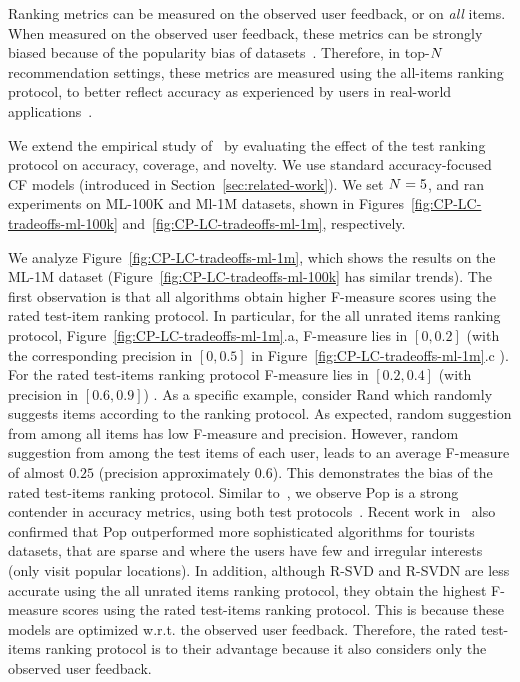 Ranking metrics can be  measured on the observed  user feedback, or on \emph{all} items.  When  measured on the observed  user feedback, these metrics can  be strongly biased because of the  popularity bias of datasets~\cite{agarwal_chen_2016,cremonesi2010performance,steck2011item,vargas2014improving,steck2013evaluation}.  Therefore,  in top-$N$ recommendation settings, these metrics are measured  using  the all-items ranking protocol,  to better reflect  accuracy as experienced by users  in real-world applications~\cite{steck2013evaluation,vargas2014improving}.


We extend the empirical study of~\cite{steck2013evaluation} by evaluating  the effect of the test ranking protocol on  accuracy, coverage, and novelty.  We use standard  accuracy-focused CF models (introduced in Section~\ref{sec:related-work}).  We set $N=5$, and ran experiments on  ML-100K and Ml-1M  datasets, shown in  Figures~\ref{fig:CP-LC-tradeoffs-ml-100k}  and~\ref{fig:CP-LC-tradeoffs-ml-1m}, respectively.    %

\balance

We analyze Figure~\ref{fig:CP-LC-tradeoffs-ml-1m}, which shows the results on the ML-1M dataset (Figure~\ref{fig:CP-LC-tradeoffs-ml-100k} has similar trends).  The first observation is that  all  algorithms obtain higher F-measure scores using the rated test-item ranking protocol. In particular, for the all unrated items ranking protocol, Figure~\ref{fig:CP-LC-tradeoffs-ml-1m}.a,  F-measure lies in $[0,0.2]$ (with the corresponding precision in $[0,0.5]$ in Figure~\ref{fig:CP-LC-tradeoffs-ml-1m}.c ). 
For the rated test-items ranking protocol  F-measure lies in $[0.2,0.4]$ (with precision in $[0.6,0.9]$) .  As a specific example, consider Rand which  randomly  suggests items according to  the ranking protocol.   As expected, random suggestion from among all items has low F-measure and precision. However, random suggestion from among the test items of each user, leads to an average F-measure of almost $0.25$ (precision approximately $0.6$). This demonstrates the bias  of the rated test-items ranking protocol. 
Similar to~\cite{cremonesi2010performance}, we observe Pop  is a strong contender in accuracy metrics, using both test protocols~\cite{cremonesi2010performance}. Recent work in~\cite{liu2017experimental} also confirmed that Pop outperformed more sophisticated algorithms for tourists datasets,   that are sparse  and where the users have few and  irregular interests (only visit popular locations). 
In addition, although R-SVD and R-SVDN are less accurate using the all unrated items ranking protocol, they obtain the highest F-measure scores using the rated test-items ranking protocol. This is because these models are optimized w.r.t. the  observed user feedback. Therefore, the rated test-items ranking protocol is to their advantage because it also considers  only the observed user feedback. 


